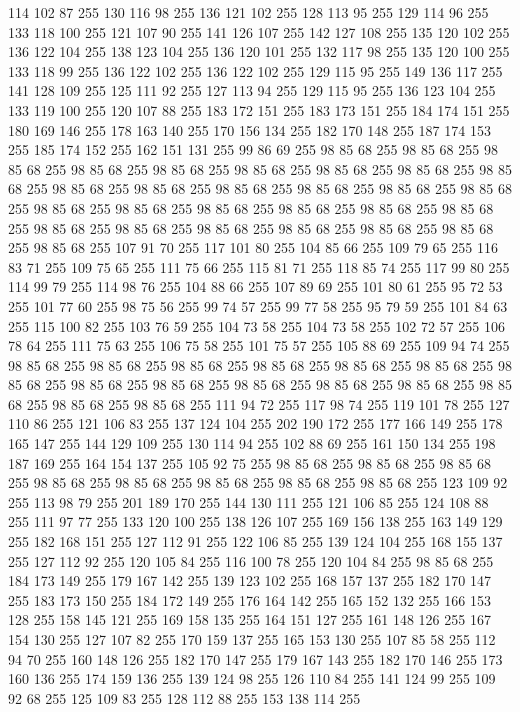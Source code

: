 114 102 87 255 130 116 98 255 136 121 102 255 128 113 95 255 129 114 96 255 133 118 100 255 121 107 90 255 141 126 107 255 142 127 108 255 135 120 102 255 136 122 104 255 138 123 104 255 136 120 101 255 132 117 98 255 135 120 100 255 133 118 99 255 136 122 102 255 136 122 102 255 129 115 95 255 149 136 117 255 141 128 109 255 125 111 92 255 127 113 94 255 129 115 95 255 136 123 104 255 133 119 100 255 120 107 88 255 183 172 151 255 183 173 151 255 184 174 151 255 180 169 146 255 178 163 140 255 170 156 134 255 182 170 148 255 187 174 153 255 185 174 152 255 162 151 131 255 99 86 69 255 98 85 68 255 98 85 68 255 98 85 68 255 98 85 68 255 98 85 68 255 98 85 68 255 98 85 68 255 98 85 68 255 98 85 68 255 98 85 68 255 98 85 68 255 98 85 68 255 98 85 68 255 98 85 68 255 98 85 68 255 98 85 68 255 98 85 68 255 98 85 68 255 98 85 68 255 98 85 68 255 98 85 68 255 98 85 68 255 98 85 68 255 98 85 68 255 98 85 68 255 98 85 68 255
98 85 68 255 98 85 68 255 107 91 70 255 117 101 80 255 104 85 66 255 109 79 65 255 116 83 71 255 109 75 65 255 111 75 66 255 115 81 71 255 118 85 74 255 117 99 80 255 114 99 79 255 114 98 76 255 104 88 66 255 107 89 69 255 101 80 61 255 95 72 53 255 101 77 60 255 98 75 56 255 99 74 57 255 99 77 58 255 95 79 59 255 101 84 63 255 115 100 82 255 103 76 59 255 104 73 58 255 104 73 58 255 102 72 57 255 106 78 64 255 111 75 63 255 106 75 58 255 101 75 57 255 105 88 69 255 109 94 74 255 98 85 68 255 98 85 68 255 98 85 68 255 98 85 68 255 98 85 68 255 98 85 68 255 98 85 68 255 98 85 68 255 98 85 68 255 98 85 68 255 98 85 68 255 98 85 68 255 98 85 68 255 98 85 68 255 98 85 68 255 111 94 72 255 117 98 74 255 119 101 78 255 127 110 86 255 121 106 83 255 137 124 104 255 202 190 172 255 177 166 149 255 178 165 147 255 144 129 109 255 130 114 94 255 102 88 69 255 161 150 134 255 198 187 169 255
164 154 137 255 105 92 75 255 98 85 68 255 98 85 68 255 98 85 68 255 98 85 68 255 98 85 68 255 98 85 68 255 98 85 68 255 98 85 68 255 123 109 92 255 113 98 79 255 201 189 170 255 144 130 111 255 121 106 85 255 124 108 88 255 111 97 77 255 133 120 100 255 138 126 107 255 169 156 138 255 163 149 129 255 182 168 151 255 127 112 91 255 122 106 85 255 139 124 104 255 168 155 137 255 127 112 92 255 120 105 84 255 116 100 78 255 120 104 84 255 98 85 68 255 184 173 149 255 179 167 142 255 139 123 102 255 168 157 137 255 182 170 147 255 183 173 150 255 184 172 149 255 176 164 142 255 165 152 132 255 166 153 128 255 158 145 121 255 169 158 135 255 164 151 127 255 161 148 126 255 167 154 130 255 127 107 82 255 170 159 137 255 165 153 130 255 107 85 58 255 112 94 70 255 160 148 126 255 182 170 147 255 179 167 143 255 182 170 146 255 173 160 136 255 174 159 136 255 139 124 98 255 126 110 84 255 141 124 99 255 109 92 68 255 125 109 83 255 128 112 88 255 153 138 114 255
